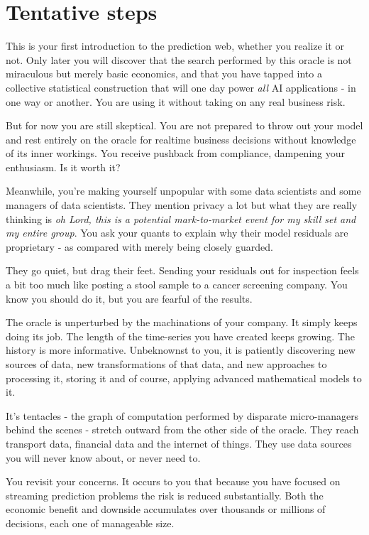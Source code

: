 \section{Tentative steps}

This is your first introduction to the prediction web, whether you realize it or not. Only later you will discover that the search performed by this oracle is not miraculous but merely basic economics, and that you have tapped into a collective statistical construction that will one day power {\em all} AI applications - in one way or another. You are using it without taking on any real business risk.       

But for now you are still skeptical. You are not prepared to throw out your model and rest entirely on the oracle for realtime business decisions without knowledge of its inner workings. You receive pushback from compliance, dampening your enthusiasm. Is it worth it? 

Meanwhile, you're making yourself unpopular with some data scientists and some managers of data scientists. They mention privacy a lot but what they are really thinking is {\em oh Lord, this is a potential mark-to-market event for my skill set and my entire group}. You ask your quants to explain why their model residuals are proprietary - as compared with merely being closely guarded. 

They go quiet, but drag their feet. Sending your residuals out for inspection feels a bit too much like posting a stool sample to a cancer screening company. You know you should do it, but you are fearful of the results. 

The oracle is unperturbed by the machinations of your company. It simply keeps doing its job. The length of the time-series you have created keeps growing. The history is more informative. Unbeknownst to you, it is patiently discovering new sources of data, new transformations of that data, and new approaches to processing it, storing it and of course, applying advanced mathematical models to it. 

It's tentacles - the graph of computation performed by disparate micro-managers behind the scenes - stretch outward from the other side of the oracle. They reach transport data, financial data and the internet of things. They use data sources you will never know about, or never need to.   

You revisit your concerns. It occurs to you that because you have focused on streaming prediction problems the risk is reduced substantially. Both the economic benefit and downside accumulates over thousands or millions of decisions, each one of manageable size. 


